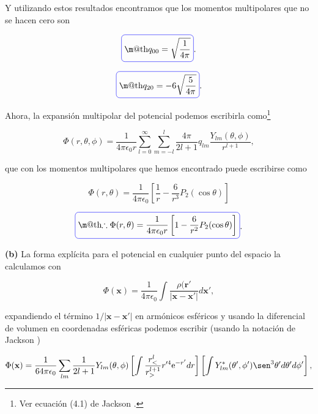 \documentclass[a4paper,11pt]{article}
\makeatletter
\numberwithin{equation}{section}
\newcommand*{\boxcolor}{blue}
\renewcommand{\boxed}[1]{\textcolor{\boxcolor}{%
\tikz[baseline={([yshift=-1ex]current bounding box.center)}] \node [rectangle, minimum width=1ex,rounded corners,draw] {\normalcolor\m@th$\displaystyle#1$};}}
\newcommand{\euler}{\mathrm{e}}
\makeatother
\begin{document}
Y utilizando estos resultados encontramos que los momentos multipolares 
que no se hacen cero son 

\begin{equation}
 \boxed{q_{00} = \sqrt{\frac{1}{4\pi}}}.
\end{equation}

\begin{equation}
 \boxed{q_{20} = -6 \sqrt{\frac{5}{4\pi}}}.
\end{equation}

Ahora, la expansión multipolar del potencial podemos escribirla como\footnote{Ver 
ecuación (4.1) de Jackson \cite{jackson}.}

\begin{equation}
  \Phi(r,\theta,\phi) = \frac{1}{4\pi\epsilon_0 r}\sum_{l=0}^\infty 
 \sum_{m=-l}^l \frac{4\pi}{2l+1} 
 q_{lm} \frac{Y_{lm}(\theta,\phi)}{r^{l+1}},
\end{equation}

que con los momentos multipolares que hemos encontrado puede escribirse como 

\begin{equation}
  \Phi(r,\theta) = \frac{1}{4\pi\epsilon_0}\left[\frac{1}{r} - 
  \frac{6}{r^3}P_2(\cos{\theta})  \right]
\end{equation}

\begin{equation}
 \boxed{\therefore \Phi(r,\theta) = \frac{1}{4\pi\epsilon_0 r}\left[1 - 
  \frac{6}{r^2}P_2(\cos{\theta})\right]}.
\end{equation}

\textbf{(b)} La forma explícita para el potencial en cualquier punto del 
espacio la calculamos con 

\begin{equation}
 \Phi(\mathbf{x}) = \frac{1}{4\pi\epsilon_0} \int \frac{\rho(\mathbf{r}'}{|\mathbf{x} - 
 \mathbf{x}'|}d\mathbf{x}',
\end{equation}

expandiendo el término $1/|\mathbf{x} -  \mathbf{x}'|$ en armónicos esféricos y usando 
la diferencial de volumen en coordenadas esféricas podemos escribir (usando la notación 
de Jackson \cite{jackson})

\begin{equation}
 \Phi(\mathbf{x}) = \frac{1}{64\pi \epsilon_0 }\sum_{lm} \frac{1}{2l+1}Y_{lm}(\theta,\phi) 
 \left[\int \frac{r^l_{<}}{r^{l+1}_{>}}r'^4\euler^{-r'} dr\right]
 \left[\int Y^*_{lm}(\theta',\phi')\sen^3{\theta'}d\theta' d\phi' \right],
\end{equation}
\end{document}
